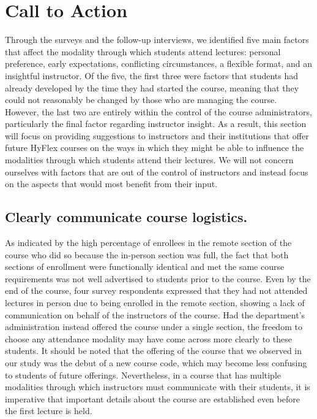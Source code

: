 \section{Call to Action}

Through the surveys and the follow-up interviews, we identified five main factors that affect the modality through which students attend lectures: personal preference, early expectations, conflicting circumstances, a flexible format, and an insightful instructor. Of the five, the first three were factors that students had already developed by the time they had started the course, meaning that they could not reasonably be changed by those who are managing the course. However, the last two are entirely within the control of the course administrators, particularly the final factor regarding instructor insight. As a result, this section will focus on providing suggestions to instructors and their institutions that offer future HyFlex courses on the ways in which they might be able to influence the modalities through which students attend their lectures. We will not concern ourselves with factors that are out of the control of instructors and instead focus on the aspects that would most benefit from their input.

\subsection{Clearly communicate course logistics.}

As indicated by the high percentage of enrollees in the remote section of the course who did so because the in-person section was full, the fact that both sections of enrollment were functionally identical and met the same course requirements was not well advertised to students prior to the course. Even by the end of the course, four survey respondents expressed that they had not attended lectures in person due to being enrolled in the remote section, showing a lack of communication on behalf of the instructors of the course. Had the department's administration instead offered the course under a single section, the freedom to choose any attendance modality may have come across more clearly to these students. It should be noted that the offering of the course that we observed in our study was the debut of a new course code, which may become less confusing to students of future offerings. Nevertheless, in a course that has multiple modalities through which instructors must communicate with their students, it is imperative that important details about the course are established even before the first lecture is held.

